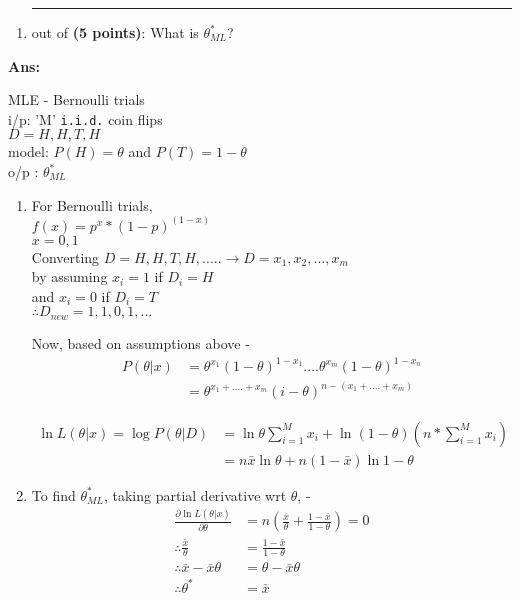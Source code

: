 \documentclass{article}%
\begin{document}
\begin{enumerate}
\begin{enumerate}
		\item \rule{0.5 in}{1 pt} out of \textbf{(5 points)}: What is $\theta _{ML}^* $?\\
	\end{enumerate}

\textbf{Ans:}

MLE - Bernoulli trials \\
i/p: 'M' \texttt{i.i.d.} coin flips \\
\hspace{1cm} $D = H,H,T,H$ \\
model: $P(H)=\theta$ and $P(T)=1-\theta$ \\
o/p : $\theta_{ML}^*$ \\

\begin{enumerate}
\item
For Bernoulli trials, \\
$ f(x) = p^x * (1-p)^(1-x) $ \\
$ x = 0,1 $ \\

Converting $ D = H,H,T,H,..... \rightarrow D = x_1, x_2, ..., x_m $ \\
by assuming 		$x_i = 1$ if $D_i = H $ \\
and \hspace{1.25cm}	$x_i = 0$ if $D_i = T $ \\
$\therefore D_{new} = 1,1,0,1,...$

Now, based on assumptions above - \\
\begin{align*}
P(\theta|x) &= \theta^{x_1} (1-\theta)^{1-x_1} .... \theta^{x_m} (1-\theta)^{1-x_n} \\
&= \theta^{x_1+....+x_m} (i-\theta)^{n-(x_1+....+x_m)}
\end{align*}

\begin{align*}
\ln{L(\theta|x)} = \log{P(\theta|D)} &= \ln{\theta} \sum_{i=1}^M{x_i} + \ln{(1-\theta)(n*\sum_{i=1}^M{x_i})} \\
&= n \bar{x} \ln{\theta} + n (1-\bar{x}) \ln{1-\theta}
\end{align*}


\item
To find $\theta^*_{ML}$, taking partial derivative wrt $\theta$, - 
\begin{align*}
\frac{\partial \ln{L(\theta|x)}}{\partial \theta} &= n \left( \frac{\bar{x}}{\theta} + \frac{1-\bar{x}}{1-\theta} \right) = 0 \\
\therefore \frac{\bar{x}}{\theta} &= \frac{1-\bar{x}}{1-\theta} \\
\therefore \bar{x} - \bar{x} \theta &= \theta - \bar{x} \theta \\
\therefore \theta^* &= \bar{x}
\end{align*}


\end{enumerate}
\end{enumerate}
\end{document}
